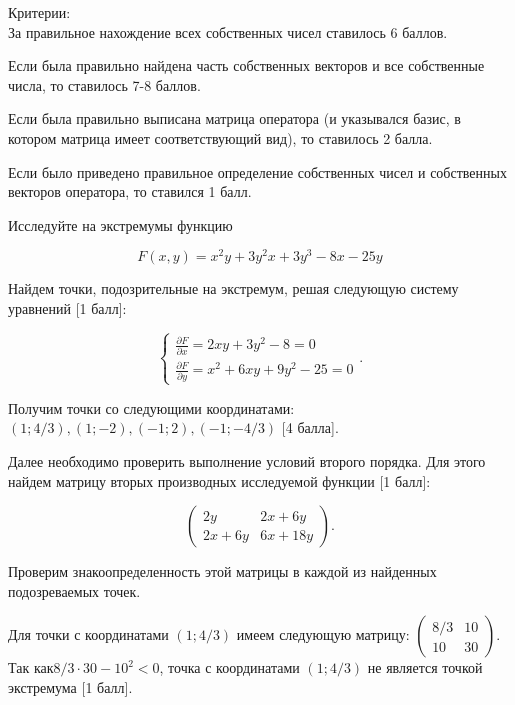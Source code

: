 \documentclass[addpoints, answers]{exam} %
\begin{document}
\begin{questions}
\begin{solution}
Критерии:\\
За правильное нахождение всех собственных чисел ставилось 6 баллов.

Если была правильно найдена часть собственных векторов и все собственные числа, то ставилось 7-8 баллов.

Если была правильно выписана матрица оператора (и указывался базис, в котором матрица имеет соответствующий вид), то ставилось 2 балла.

Если было приведено правильное определение собственных чисел и собственных векторов оператора, то ставился 1 балл.

\end{solution}

\question[10] Исследуйте на экстремумы функцию

\[
F(x,y)=x^{2} y+3y^{2} x+3y^{3} -8x-25y
\]


\begin{solution}


Найдем точки, подозрительные на экстремум, решая следующую систему уравнений $[$1 балл]:

\[\left\{\begin{array}{c} {\frac{\partial F}{\partial x} =2xy+3y^{2} -8=0} \\ {\frac{\partial F}{\partial y} =x^{2} +6xy+9y^2-25=0} \end{array}\right. .\] 

Получим точки со следующими координатами: $\left(1;4/3\right),\left(1;-2\right),\left(-1;2\right),\left(-1;-4/3\right)$ $[$4 балла].

Далее необходимо проверить выполнение условий второго порядка. Для этого найдем матрицу вторых производных исследуемой функции $[$1 балл]:

\[\left(\begin{array}{cc} {2y} & {2x+6y} \\ {2x+6y} & {6x+18y} \end{array}\right).\] 

Проверим знакоопределенность этой матрицы в каждой из найденных подозреваемых точек.

Для точки с координатами $\left(1;4/3\right)$ имеем следующую матрицу: $\left(\begin{array}{cc} {8/3} & {10} \\ {10} & {30} \end{array}\right)$. Так как$8/3\cdot 30-10^{2} <0$, точка с координатами $\left(1;4/3\right)$ не является точкой экстремума $[$1 балл].


\end{solution}
\end{questions}
\end{document}
